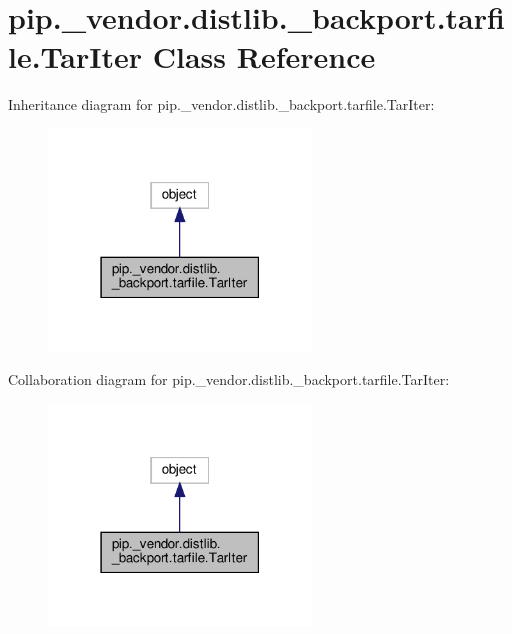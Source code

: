 \hypertarget{classpip_1_1__vendor_1_1distlib_1_1__backport_1_1tarfile_1_1TarIter}{}\section{pip.\+\_\+vendor.\+distlib.\+\_\+backport.\+tarfile.\+Tar\+Iter Class Reference}
\label{classpip_1_1__vendor_1_1distlib_1_1__backport_1_1tarfile_1_1TarIter}


Inheritance diagram for pip.\+\_\+vendor.\+distlib.\+\_\+backport.\+tarfile.\+Tar\+Iter\+:
\nopagebreak
\begin{figure}[H]
\begin{center}
\leavevmode
\includegraphics[width=198pt]{classpip_1_1__vendor_1_1distlib_1_1__backport_1_1tarfile_1_1TarIter__inherit__graph}
\end{center}
\end{figure}


Collaboration diagram for pip.\+\_\+vendor.\+distlib.\+\_\+backport.\+tarfile.\+Tar\+Iter\+:
\nopagebreak
\begin{figure}[H]
\begin{center}
\leavevmode
\includegraphics[width=198pt]{classpip_1_1__vendor_1_1distlib_1_1__backport_1_1tarfile_1_1TarIter__coll__graph}
\end{center}
\end{figure}
